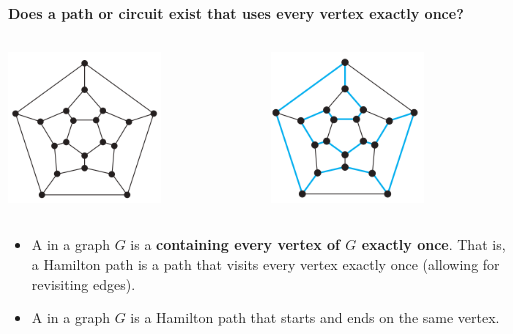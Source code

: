 \documentclass[aspectratio=169]{beamer}
\begin{document}
\begin{frame}[plain]{} 


\begin{center}
  {\bf Does a path or circuit exist that uses every vertex exactly once?
  }
\end{center}

\vspace{.1in}

\begin{columns}[t] %
\begin{column}[c]{5cm}

  \begin{center}
     \includegraphics[height=4cm]{./img/lecture6-fig1a.png}
  \end{center}
   
  \end{column} \pause
  \begin{column}[c]{5cm}
      \begin{center}
        \includegraphics[height=4cm]{./img/lecture6-fig1b.png}
      \end{center}
  \end{column}
  \end{columns}
\vspace{.2in}


\begin{itemize}
           \item A  in a graph $G$ is a  {\bf containing 
              every vertex of $G$ exactly once}. 
               That is, a Hamilton path is a path that
              visits every vertex exactly once 
              (allowing for revisiting edges).
           \item A  in a graph $G$ 
           is a Hamilton path that starts and ends on the same vertex.
          \end{itemize}
    
\end{frame}
\end{document}
